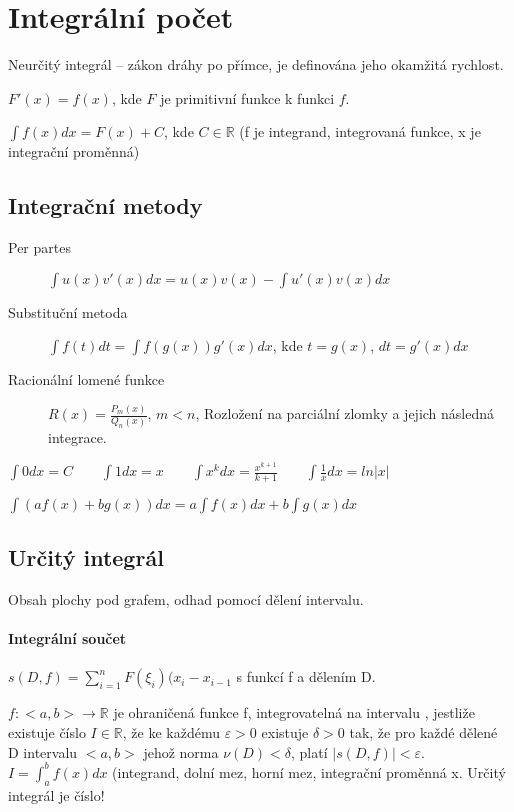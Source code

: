 \documentclass[a4paper, 11pt]{report}
\begin{document}
\section{Integrální počet}

Neurčitý integrál -- zákon dráhy po přímce, je definována jeho okamžitá rychlost.

$F'(x) = f(x)$, kde $F$ je primitivní funkce k funkci $f$.

$\int f(x) dx = F(x) + C$, kde $C \in \mathbb{R}$ (f je integrand, integrovaná funkce, x je integrační proměnná)

\subsection{Integrační metody}
\begin{description}
	\item[Per partes] $\int u(x) v'(x) dx = u(x) v(x) - \int u'(x) v(x) dx$
	\item[Substituční metoda] $\int f(t) dt = \int f( g(x) ) g'(x) dx$, kde $t = g(x)$, $dt = g'(x)dx$
	\item[Racionální lomené funkce] $R(x) = \frac{P_m(x)}{Q_n(x)}$, $m < n$, Rozložení na parciální zlomky a jejich následná integrace.
\end{description}

$\int 0 dx = C \qquad
\int 1 dx = x \qquad
\int x^k dx = \frac{x^{k+1}}{k+1} \qquad
\int \frac{1}{x} dx = ln |x|$

$\int\left(a f \left(x \right) + b g \left(x \right) \right) dx = a \int f(x) dx + b \int g(x) dx$

\subsection{Určitý integrál} Obsah plochy pod grafem, odhad pomocí dělení intervalu.

\paragraph{Integrální součet} $s(D,f) = \sum\limits_{i=1}^n F(\xi_i) (x_i - x_{i-1}$ s funkcí f a dělením D.

$f: <a,b> \to \mathbb{R}$ je ohraničená funkce f, integrovatelná na intervalu , jestliže existuje číslo $I \in \mathbb{R}$, že ke každému $\varepsilon > 0$ existuje $\delta > 0$ tak, že pro každé dělené D intervalu $<a,b>$ jehož norma $\nu(D) < \delta$, platí $|s(D,f)| < \varepsilon$.
$I = \int_a^b f(x) dx$ (integrand, dolní mez, horní mez, integrační proměnná x. Určitý integrál je číslo!
\end{document}
